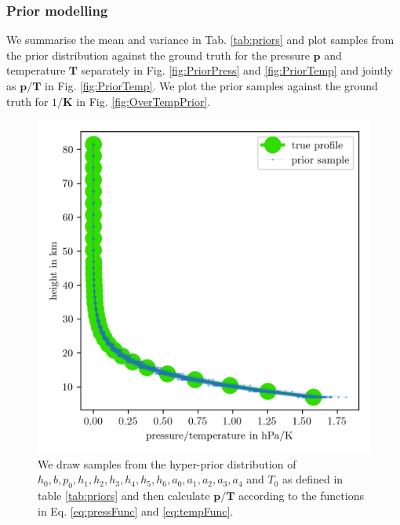 \subsubsection{Prior modelling}
We summarise the mean and variance in Tab. \ref{tab:priors} and plot samples from the prior distribution against the ground truth for the pressure $\bm{p}$ and temperature $\bm{T}$ separately in Fig. \ref{fig:PriorPress} and \ref{fig:PriorTemp} and jointly as $\bm{p}/\bm{T}$ in Fig. \ref{fig:PriorTemp}.
We plot the prior samples against the ground truth for $1/\bm{K}$ in Fig. \ref{fig:OverTempPrior}.
\begin{figure}[ht!]
	\centering
	\includegraphics{PriorTempOverPostMeanSigm.png}
	\caption[Prior Samples of $\bm{p}/\bm{T}$ according to the respective hyper-prior distribution.]{We draw samples from the hyper-prior distribution of $h_0, b, p_0, h_1, h_2,h_3,h_4,h_5,h_6, a_0, a_1, a_2,a_3,a_4$ and $T_0$ as defined in table \ref{tab:priors} and then calculate $\bm{p}/\bm{T}$ according to the functions in Eq. \ref{eq:pressFunc} and \ref{eq:tempFunc}.}
	\label{fig:PriorPressOverTemp}
\end{figure}

